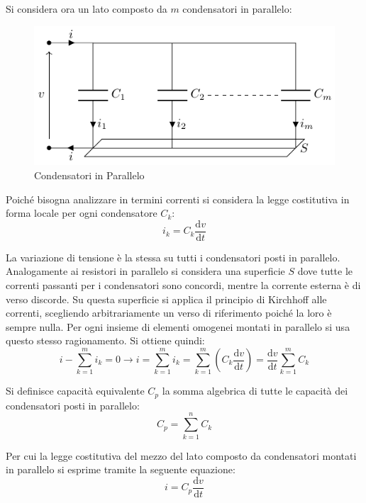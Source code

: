\documentclass{article}
\newcommand{\df}{\mathrm{d}}
\numberwithin{equation}{subsection}
\begin{document}
Si considera ora un lato composto da $m$ condensatori in parallelo:
\begin{figure}[H]%
    \centering
    \includegraphics{condensatore-parallelo.pdf}%
    \caption{Condensatori in Parallelo}%
    \label{fig:condensatore-parallelo}
\end{figure}

Poiché bisogna analizzare in termini correnti si considera la legge costitutiva in forma locale per ogni condensatore $C_k$:
\begin{equation*}
    i_k=C_k\displaystyle\frac{\df v}{\df t}
\end{equation*}

La variazione di tensione è la stessa su tutti i condensatori posti in parallelo. Analogamente ai resistori in parallelo si considera una superficie $S$ dove tutte le correnti 
passanti per i condensatori sono concordi, mentre la corrente esterna è di verso discorde. Su questa superficie si applica il principio di Kirchhoff alle correnti, scegliendo 
arbitrariamente un verso di riferimento poiché la loro è sempre nulla. Per ogni insieme di elementi omogenei montati in parallelo si usa questo stesso ragionamento. 
Si ottiene quindi:
\begin{equation*}
    i-\displaystyle\sum_{k=1}^mi_k=0\to i=\sum_{k=1}^mi_k=\sum_{k=1}^m\left(C_k\frac{\df v}{\df t}\right)=\frac{\df v}{\df t}\sum_{k=1}^mC_k
\end{equation*}

Si definisce capacità equivalente $C_p$ la somma algebrica di tutte le capacità dei condensatori posti in parallelo:
\begin{equation*}
    C_p=\displaystyle\sum_{k=1}^nC_k
\end{equation*}

Per cui la legge costitutiva del mezzo del lato composto da condensatori montati in parallelo si esprime tramite la seguente equazione:
\begin{equation}
    i=C_p\displaystyle\frac{\df v}{\df t}
\end{equation}
\end{document}
